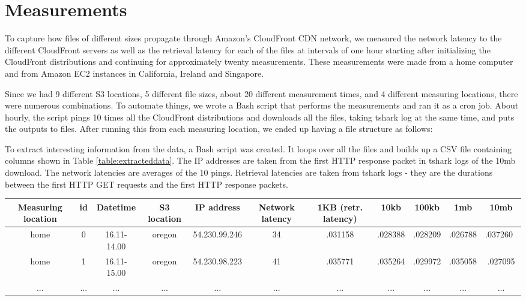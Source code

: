 \documentclass[conference]{IEEEtran}
\begin{document}
\section{Measurements}
To capture how files of different sizes propagate through Amazon's CloudFront CDN network, we measured the network latency to the different CloudFront servers as well as the retrieval latency for each of the files at intervals of one hour starting after initializing the CloudFront distributions and continuing for approximately twenty measurements. These measurements were made from a home computer and from Amazon EC2 instances in California, Ireland and Singapore.


Since we had 9 different S3 locations, 5 different file sizes, about 20 different measurement times, and 4 different measuring locations, there were numerous combinations. To automate things, we wrote a Bash script that performs the measurements and ran it as a cron job. About hourly, the script pings 10 times all the CloudFront distributions and downloads all the files, taking tshark log at the same time, and puts the outputs to files. After running this from each measuring location, we ended up having a file structure as follows:\\


To extract interesting information from the data, a Bash script was created. It loops over all the files and builds up a CSV file containing columns shown in Table \ref{table:extracteddata}. The IP addresses are taken from the first HTTP response packet in tshark logs of the 10mb download. The network latencies are averages of the 10 pings. Retrieval latencies are taken from tshark logs - they are the durations between the first HTTP GET requests and the first HTTP response packets.

\begin{table*}
\renewcommand{\arraystretch}{1.3}
\caption{Extracted data}
\centering
\begin{tabular}{|c|c|c|c|c|c|c|c|c|c|c|}
\hline
\bfseries Measuring location & \bfseries id & \bfseries Datetime & \bfseries S3 location & \bfseries IP address & \bfseries Network latency & \bfseries 1KB (retr. latency) & \bfseries 10kb & \bfseries 100kb & \bfseries 1mb & \bfseries 10mb \\
\hline\hline
home & 0 & 16.11-14.00 & oregon & 54.230.99.246 & 34 & .031158 & .028388 & .028209 & .026788 & .037260 \\
\hline
home & 1 & 16.11-15.00 & oregon & 54.230.98.223 & 41 & .035771 & .035264 & .029972 & .035058 & .027095 \\
\hline
... & ... & ... & ... & ... & ... & ... & ... & ... & ... & ... \\
\hline
\end{tabular}
\label{table:extracteddata}
\end{table*}
\end{document}
